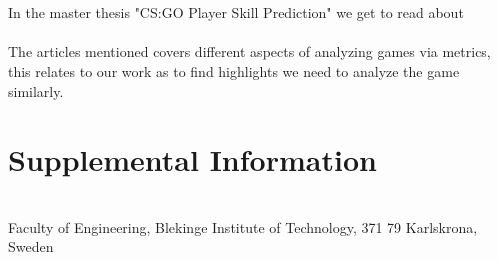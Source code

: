 \documentclass[a4paper,twoside]{bth}
\newcommand{\faculty}{Engineering}
\begin{document}
\\\\
In the master thesis "CS:GO Player Skill Prediction" \cite{BaranNama} we get to read about 
\\\\
The articles mentioned covers different aspects of analyzing games via metrics, this relates to our work as to find highlights we need to analyze the game similarly. 








\appendix
\chapter{Supplemental Information}


\cleardoublepage
\thispagestyle{empty}
\vspace*{\fill}
\clearpage{\thispagestyle{empty}}
\changepage{3cm}{1cm}{-0.5cm}{-0.5cm}{}{-1.5cm}{}{}{}
\vspace*{\fill}
\center

{\bthcsnotextlogo{3cm}}
\\
\noindent\makebox[\linewidth]{\rule{\textwidth}{1pt}} 
Faculty of \faculty, Blekinge Institute of Technology, 371 79 Karlskrona, Sweden
\end{document}
